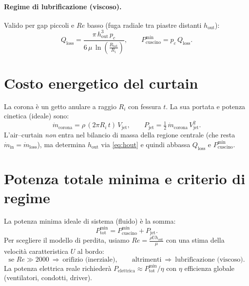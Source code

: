 \documentclass[11pt,a4paper]{article}
\begin{document}
\paragraph{Regime di lubrificazione (viscoso).}
Valido per gap piccoli e \(Re\) basso (fuga radiale tra piastre distanti \(h_{\mathrm{out}}\)):
\begin{equation}
  Q_{\mathrm{loss}}=\frac{\pi\,h_{\mathrm{out}}^3\,p_c}{6\,\mu\,\ln\!\left(\tfrac{R_{\mathrm{tot}}}{R_i}\right)},
  \qquad
  P_{\mathrm{cuscino}}^{\min}=p_c\,Q_{\mathrm{loss}}.
\end{equation}

\section{Costo energetico del curtain}
La corona è un getto anulare a raggio \(R_i\) con fessura \(t\). La sua portata e potenza cinetica (ideale) sono:
\begin{equation}
  \dot{m}_{\mathrm{corona}}=\rho\,(2\pi R_i\,t)\,V_{\mathrm{jet}},
  \qquad
  P_{\mathrm{jet}}=\tfrac{1}{2}\,\dot{m}_{\mathrm{corona}}\,V_{\mathrm{jet}}^2.
\end{equation}
L'air--curtain \emph{non} entra nel bilancio di massa della regione centrale (che resta \(\dot{m}_{\mathrm{in}}=\dot{m}_{\mathrm{loss}}\)), ma determina \(h_{\mathrm{out}}\) via \eqref{eq:hout} e quindi abbassa \(Q_{\mathrm{loss}}\) e \(P_{\mathrm{cuscino}}^{\min}\).

\section{Potenza totale minima e criterio di regime}
La potenza minima ideale di sistema (fluido) è la somma:
\begin{equation}
  P_{\mathrm{tot}}^{\min}=P_{\mathrm{cuscino}}^{\min}+P_{\mathrm{jet}}.
\end{equation}
Per scegliere il modello di perdita, usiamo \(Re=\tfrac{\rho U h_{\mathrm{out}}}{\mu}\) con una stima della velocità caratteristica \(U\) al bordo:
\[
\text{se }Re\gg 2000 \ \Rightarrow\ \text{orifizio (inerziale)},\qquad
\text{altrimenti}\ \Rightarrow\ \text{lubrificazione (viscoso)}.
\]
La potenza elettrica reale richiederà \(P_{\mathrm{elettrica}}\approx P_{\mathrm{tot}}^{\min}/\eta\) con \(\eta\) efficienza globale (ventilatori, condotti, driver).
\end{document}
